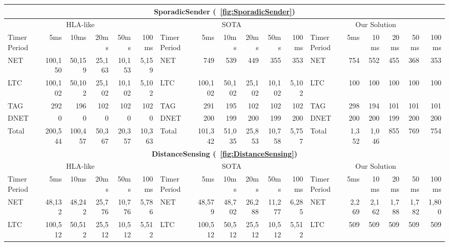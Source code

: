 \begin{table*}
\scriptsize
	\centering
	\begin{tabular}{|l|rrrrr||l|rrrrr||l|rrrrr|}
		\hline
		\multicolumn{18}{|c|}{\textbf{SporadicSender (\figurename~\ref{fig:SporadicSender})}} \\
		\hline
		\multicolumn{6}{|c||}{HLA-like} & \multicolumn{6}{|c||}{SOTA} & \multicolumn{6}{|c|}{Our Solution} \\
		\hline
		Timer Period \hspace{-5pt} & 5ms & 10ms & 20ms & 50ms & 100ms & Timer Period \hspace{-5pt} & 5ms & 10ms & 20ms & 50ms & 100ms & Timer Period \hspace{-5pt} & 5ms & 10ms & 20ms & 50ms & 100ms \\
		\hline
		NET & 100,150 & 50,159 & 25,163 & 10,153 & 5,159 & NET & 749 & 539 & 449 & 355 & 353 & NET & 754 & 552 & 455 & 368 & 353 \\
		LTC & 100,102 & 50,102 & 25,102 & 10,102 & 5,102 & LTC & 100,102 & 50,102 & 25,102 & 10,102 & 5,102 & LTC & 100 & 100 & 100 & 100 & 100 \\
		TAG & 292 & 196 & 102 & 102 & 102 & TAG & 291 & 195 & 102 & 102 & 102 & TAG & 298 & 194 & 101 & 101 & 101 \\
		DNET & 0 & 0 & 0 & 0 & 0 & DNET & 200 & 199 & 200 & 199 & 200 & DNET & 200 & 200 & 199 & 200 & 200 \\
		\hline
		Total & 200,544 & 100,457 & 50,367 & 20,357 & 10,363 & Total & 101,342 & 51,035 & 25,853 & 10,758 & 5,757 & Total & 1,352 & 1,046 & 855 & 769 & 754 \\
		\hline
%
		\hline
		\hline
		\multicolumn{18}{|c|}{\textbf{DistanceSensing (\figurename~\ref{fig:DistanceSensing})}} \\
		\hline
		\multicolumn{6}{|c||}{HLA-like} & \multicolumn{6}{|c||}{SOTA} & \multicolumn{6}{|c|}{Our Solution} \\
		\hline
		Timer Period \hspace{-5pt} & 5ms & 10ms & 20ms & 50ms & 100ms & Timer Period \hspace{-5pt} & 5ms & 10ms & 20ms & 50ms & 100ms & Timer Period \hspace{-5pt} & 5ms & 10ms & 20ms & 50ms & 100ms \\
		\hline
		NET & 48,132 & 48,242 & 25,776 & 10,776 & 5,786 & NET & 48,579 & 48,702 & 26,288 & 11,277 & 6,285 & NET & 2,269 & 2,162 & 1,788 & 1,782 & 1,800 \\
		LTC & 100,512 & 50,512 & 25,512 & 10,512 & 5,512 & LTC & 100,512 & 50,512 & 25,512 & 10,512 & 5,512 & LTC & 509 & 509 & 509 & 509 & 509 \\

\end{tabular}
\end{table*}
